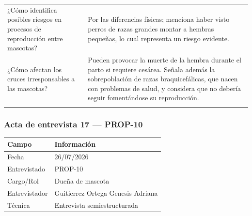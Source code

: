 \documentclass[journal,onecolumn]{IEEEtran}
\begin{document}
{\begin{longtable}{@{}p{5.6cm} p{9.4cm}@{}}
			¿Cómo identifica posibles riesgos en procesos de reproducción entre mascotas? & Por las diferencias físicas; menciona haber visto perros de razas grandes montar a hembras pequeñas, lo cual representa un riesgo evidente. \\ \addlinespace
			
			¿Cómo afectan los cruces irresponsables a las mascotas? & Pueden provocar la muerte de la hembra durante el parto si requiere cesárea. Señala además la sobrepoblación de razas braquicefálicas, que nacen con problemas de salud, y considera que no debería seguir fomentándose su reproducción. \\ \addlinespace
			
		\end{longtable}
	}
	
	
	\subsubsection*{Acta de entrevista 17 --- PROP-10}
	
	\begin{table}[H]
		\centering\small
		\begin{tabularx}{\textwidth}{@{}l X@{}}
			\toprule
			\textbf{Campo} & \textbf{Información} \\
			\midrule
			
			Fecha & 26/07/2026 \\
			
			Entrevistado & PROP-10 \\
			
			Cargo/Rol & Dueña de mascota \\
			
			Entrevistador & Guitierrez Ortega Genesis Adriana \\
			
			Técnica & Entrevista semiestructurada \\
			
			\bottomrule
		\end{tabularx}
	\end{table}
	
\end{document}

